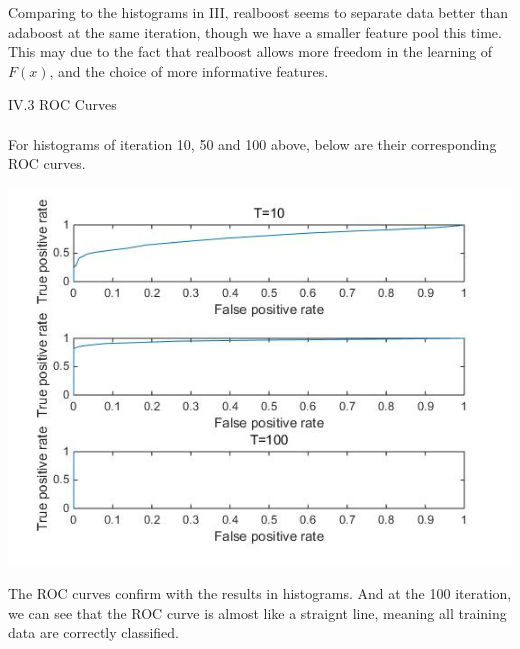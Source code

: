 \documentclass[12pt]{article}
\newenvironment{p3}[2][IV Realboost for Face Detection]{\begin{trivlist}
\item[\hskip \labelsep {\bfseries #1}\hskip \labelsep {\bfseries #2}]}{\end{trivlist}}
\begin{document}
\begin{p3}{}
\begin{center}
\end{center}
Comparing to the histograms in III, realboost seems to separate data better than adaboost at the same iteration, though we have a smaller feature pool this time. This may due to the fact that realboost allows more freedom in the learning of $F(x)$, and the choice of more informative features.
\item{IV.3 ROC Curves\\\\}
For histograms of iteration 10, 50 and 100 above, below are their corresponding ROC curves.
\begin{center}
		\includegraphics[height=10cm]{data/realboost_roc.jpg}
\end{center}
The ROC curves confirm with the results in histograms. And at the 100 iteration, we can see that the ROC curve is almost like a straignt line, meaning all training data are correctly classified.


\end{p3}
\end{document}
